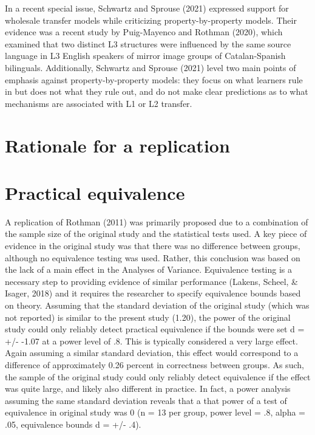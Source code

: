 \documentclass[
  man]{apa6}
\begin{document}
In a recent special issue, Schwartz and Sprouse (2021) expressed support for wholesale transfer models while criticizing property-by-property models.
Their evidence was a recent study by Puig-Mayenco and Rothman (2020), which examined that two distinct L3 structures were influenced by the same source language in L3 English speakers of mirror image groups of Catalan-Spanish bilinguals.
Additionally, Schwartz and Sprouse (2021) level two main points of emphasis against property-by-property models: they focus on what learners rule in but does not what they rule out, and do not make clear predictions as to what mechanisms are associated with L1 or L2 transfer.

\hypertarget{rationale-for-a-replication}{%
\section{Rationale for a replication}\label{rationale-for-a-replication}}

\hypertarget{practical-equivalence}{%
\section{Practical equivalence}\label{practical-equivalence}}

A replication of Rothman (2011) was primarily proposed due to a combination of the sample size of the original study and the statistical tests used.
A key piece of evidence in the original study was that there was no difference between groups, although no equivalence testing was used.
Rather, this conclusion was based on the lack of a main effect in the Analyses of Variance.
Equivalence testing is a necessary step to providing evidence of similar performance (Lakens, Scheel, \& Isager, 2018) and it requires the researcher to specify equivalence bounds based on theory.
Assuming that the standard deviation of the original study (which was not reported) is similar to the present study (1.20), the power of the original study could only reliably detect practical equivalence if the bounds were set d = +/- -1.07 at a power level of .8.
This is typically considered a very large effect.
Again assuming a similar standard deviation, this effect would correspond to a difference of approximately 0.26 percent in correctness between groups.
As such, the sample of the original study could only reliably detect equivalence if the effect was quite large, and likely also different in practice.
In fact, a power analysis assuming the same standard deviation reveals that a that power of a test of equivalence in original study was 0 (n = 13 per group, power level = .8, alpha = .05, equivalence bounds d = +/- .4).
\end{document}
